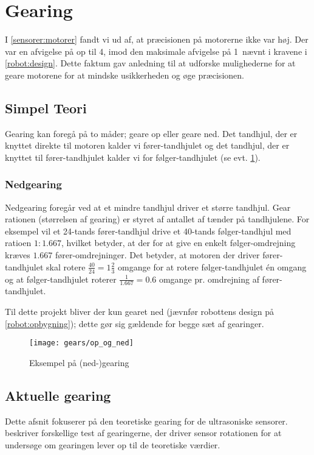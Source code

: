 \section{Gearing}\label{robot:gearing}
I \cref{sensorer:motorer} fandt vi ud af, at præcisionen på motorerne ikke var høj.
Der var en afvigelse på op til 4\dg, imod den maksimale afvigelse på 1\dg ~nævnt i kravene i \cref{robot:design}.
Dette faktum gav anledning til at udforske mulighederne for at geare motorene for at mindske usikkerheden og øge præcisionen.

\subsection{Simpel Teori}\label{gearing:simpel_teori}
Gearing kan foregå på to måder; geare op eller geare ned.
Det tandhjul, der er knyttet direkte til motoren kalder vi fører-tandhjulet og det tandhjul, der er knyttet til fører-tandhjulet kalder vi for følger-tandhjulet (se evt. \cref{gearing:nedgearing}).

\subsubsection{Nedgearing}
Nedgearing foregår ved at et mindre tandhjul driver et større tandhjul.
Gear rationen (størrelsen af gearing) er styret af antallet af tænder på tandhjulene.
For eksempel vil et 24-tands fører-tandhjul drive et 40-tands følger-tandhjul med ratioen $1:1.667$, hvilket betyder, at der for at give en enkelt følger-omdrejning kræves $1.667$ fører-omdrejninger. 
Det betyder, at motoren der driver fører-tandhjulet skal rotere $\frac{40}{24} = 1 \frac{2}{3}$ omgange for at rotere følger-tandhjulet én omgang og at følger-tandhjulet roterer $\frac{1}{1.667} = 0.6$ omgange pr. omdrejning af fører-tandhjulet.

Til dette projekt bliver der kun gearet ned (jævnfør robottens design på \cref{robot:opbygning}); dette gør sig gældende for begge sæt af gearinger.


\begin{figure}[h]
\centering
\texttt{[image: gears/op\_og\_ned]}
\caption{Eksempel på (ned-)gearing}
\label{gearing:nedgearing}
\end{figure}

\subsection{Aktuelle gearing}
Dette afsnit fokuserer på den teoretiske gearing for de ultrasoniske sensorer.
 beskriver forskellige test af gearingerne, der driver sensor rotationen for at undersøge om gearingen lever op til de teoretiske værdier.


